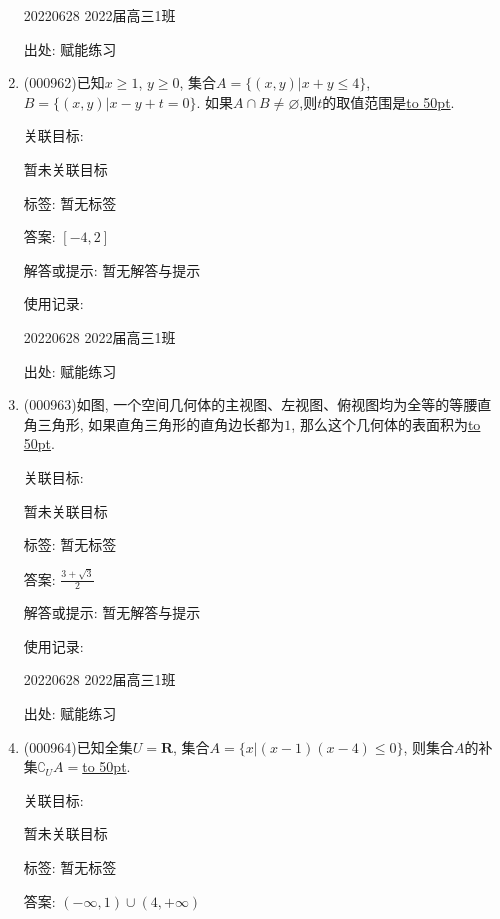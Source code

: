\documentclass[10pt,a4paper]{article}
\newcommand{\blank}[1]{\underline{\hbox to #1pt{}}}
\begin{document}
\begin{enumerate}[1.]
20220628	2022届高三1班	


出处: 赋能练习
\item { (000962)}已知$x\ge 1$, $y\ge 0$, 集合$A=\{(x,y)|x+y\le 4\}$, $B=\{(x,y)|x-y+t=0\}$. 如果$A\cap B\ne \varnothing$,则$t$的取值范围是\blank{50}.


关联目标:

暂未关联目标



标签: 暂无标签

答案: $[-4,2]$

解答或提示: 暂无解答与提示

使用记录:

20220628	2022届高三1班	


出处: 赋能练习
\item { (000963)}如图, 一个空间几何体的主视图、左视图、俯视图均为全等的等腰直角三角形, 如果直角三角形的直角边长都为$1$, 那么这个几何体的表面积为\blank{50}.
\begin{center}
\end{center}


关联目标:

暂未关联目标



标签: 暂无标签

答案: $\frac{3+\sqrt 3}2$

解答或提示: 暂无解答与提示

使用记录:

20220628	2022届高三1班	


出处: 赋能练习
\item { (000964)}已知全集$U=\mathbf{R}$, 集合$A=\{x|(x-1)(x-4)\le 0\}$, 则集合$A$的补集$\complement_UA=$\blank{50}.


关联目标:

暂未关联目标



标签: 暂无标签

答案: $(-\infty ,1)\cup (4,+\infty)$


\end{enumerate}
\end{document}
